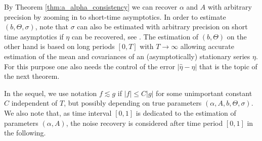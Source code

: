 \documentclass[11pt,reqno,oneside, a4paper]{amsart}
\numberwithin{equation}{section}
\theoremstyle{remark}
\begin{document}
By Theorem \ref{thm:a_alpha_consistency} we can recover $\alpha$ and $A$ with arbitrary precision by zooming in to short-time asymptotics. In order to estimate $(b,\Theta,\sigma)$, note that $\sigma$ can also be estimated with arbitrary precision on short time asymptotics if $\eta$ can be recovered, see \cite{Vasicek2025}. The estimation of $(b,\Theta)$ on the other hand is based on long periods $[0,T]$ with $T\to \infty$ allowing accurate estimation of the mean and covariances of an (asymptotically) stationary series $\eta$. For this purpose one also needs the control of the error $|\hat\eta-\eta|$ that is the topic of the next theorem. 

In the sequel, we use notation $f\lesssim g$ if $|f|\leq C|g|$ for some unimportant constant $C$ independent of $T$, but possibly depending on true parameters $(\alpha,A,b,\Theta,\sigma)$. We also note that, as time interval $[0,1]$ is dedicated to the estimation of parameters $(\alpha,A)$, the noise recovery is considered after time period $[0,1]$  in the following.
\end{document}
